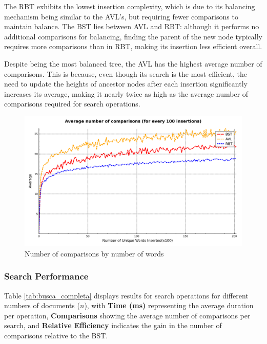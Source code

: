 The RBT exhibits the lowest insertion complexity, which is due to its balancing mechanism being similar to the AVL's, but requiring fewer comparisons to maintain balance. The BST lies between AVL and RBT: although it performs no additional comparisons for balancing, finding the parent of the new node typically requires more comparisons than in RBT, making its insertion less efficient overall.

Despite being the most balanced tree, the AVL has the highest average number of comparisons. This is because, even though its search is the most efficient, the need to update the heights of ancestor nodes after each insertion significantly increases its average, making it nearly twice as high as the average number of comparisons required for search operations.

\begin{figure}[H]
     \centering
     \includegraphics[width=0.8\linewidth]{img/Graph_3_20273.pdf}
     \caption{Number of comparisons by number of words}
     \label{fig:mean-log}
\end{figure}


 \subsubsection{Search Performance}

 Table \ref{tab:busca_completa} displays results for search operations for different numbers
 of documents ($n$), with \textbf{Time (ms)}
 representing the average duration per operation, \textbf{Comparisons} showing the average number of comparisons per search,
 and \textbf{Relative Efficiency} indicates the gain in the number of comparisons relative to the BST.

